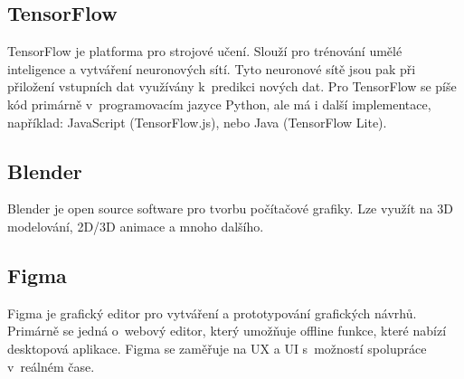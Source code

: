 \subsection{TensorFlow}
TensorFlow je platforma pro strojové učení. Slouží pro trénování umělé inteligence a vytváření neuronových sítí. Tyto neuronové sítě jsou pak při přiložení vstupních dat využívány k~predikci nových dat. Pro TensorFlow se píše kód primárně v~programovacím jazyce Python, ale má i další implementace, například: JavaScript (TensorFlow.js), nebo Java (TensorFlow Lite).

\subsection{Blender}
Blender je open source software pro tvorbu počítačové grafiky. Lze využít na 3D modelování, 2D/3D animace a mnoho dalšího.

\subsection{Figma}
Figma je grafický editor pro vytváření a prototypování grafických návrhů. Primárně se jedná o~webový editor, který umožňuje offline funkce, které nabízí desktopová aplikace. Figma se zaměřuje na UX a UI s~možností spolupráce v~reálném čase.


